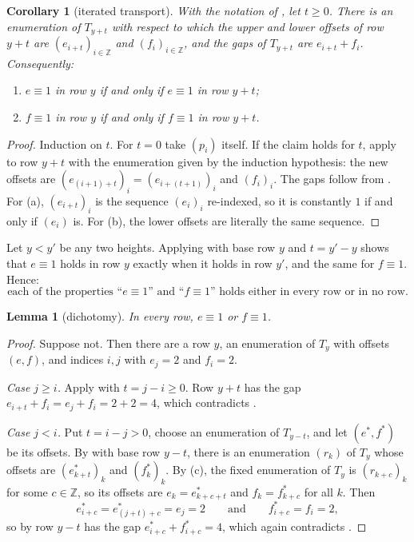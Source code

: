 \documentclass[11pt]{article}
\theoremstyle{plain}
\newtheorem{lemma}[lemma]{Lemma}
\newtheorem{corollary}[corollary]{Corollary}
\theoremstyle{definition}
\theoremstyle{remark}
\newcommand{\Z}{\mathbb{Z}}
\begin{document}
\begin{corollary}[iterated transport]\label{cor:transport-s}
With the notation of , let $t \ge 0$. There is an enumeration of
$T_{y+t}$ with respect to which the upper and lower offsets of row $y+t$ are
$(e_{i+t})_{i \in \Z}$ and $(f_i)_{i \in \Z}$, and the gaps of $T_{y+t}$ are
$e_{i+t} + f_i$. Consequently:
\begin{enumerate}[label=(\alph*)]
  \item $e \equiv 1$ in row $y$ if and only if $e \equiv 1$ in row $y+t$;
  \item $f \equiv 1$ in row $y$ if and only if $f \equiv 1$ in row $y+t$.
\end{enumerate}
\end{corollary}

\begin{proof}
Induction on $t$. For $t = 0$ take $(p_i)$ itself. If the claim holds for $t$, apply
 to row $y + t$ with the enumeration given by the induction hypothesis:
the new offsets are $(e_{(i+1)+t})_i = (e_{i + (t+1)})_i$ and $(f_i)_i$. The gaps follow from
. For (a), $(e_{i+t})_i$ is the sequence $(e_i)_i$ re-indexed, so it is
constantly $1$ if and only if $(e_i)$ is. For (b), the lower offsets are literally the same
sequence.
\end{proof}

Let $y < y'$ be any two heights. Applying  with base row $y$ and
$t = y' - y$ shows that $e \equiv 1$ holds in row $y$ exactly when it holds in row $y'$, and
the same for $f \equiv 1$. Hence:
\begin{equation}\label{eq:all-or-none}
\text{each of the properties ``$e \equiv 1$'' and ``$f \equiv 1$'' holds either in every row
or in no row.}
\end{equation}

\begin{lemma}[dichotomy]\label{lem:dichotomy}
In every row, $e \equiv 1$ or $f \equiv 1$.
\end{lemma}

\begin{proof}
Suppose not. Then there are a row $y$, an enumeration of $T_y$ with offsets $(e,f)$, and
indices $i, j$ with $e_j = 2$ and $f_i = 2$.

\emph{Case $j \ge i$.} Apply  with $t = j - i \ge 0$. Row $y + t$ has
the gap $e_{i+t} + f_i = e_j + f_i = 2 + 2 = 4$, which contradicts .

\emph{Case $j < i$.} Put $t = i - j > 0$, choose an enumeration of $T_{y-t}$, and let
$(e^\ast, f^\ast)$ be its offsets. By  with base row $y - t$, there is
an enumeration $(r_k)$ of $T_y$ whose offsets are $(e^\ast_{k+t})_k$ and $(f^\ast_k)_k$. By
(c), the fixed enumeration of $T_y$ is $(r_{k+c})_k$ for some $c \in \Z$, so
its offsets are $e_k = e^\ast_{k+c+t}$ and $f_k = f^\ast_{k+c}$ for all $k$. Then
\[
e^\ast_{i+c} = e^\ast_{(j+t)+c} = e_j = 2
\qquad\text{and}\qquad
f^\ast_{i+c} = f_i = 2,
\]
so by  row $y - t$ has the gap
$e^\ast_{i+c} + f^\ast_{i+c} = 4$, which again contradicts .
\end{proof}
\end{document}

